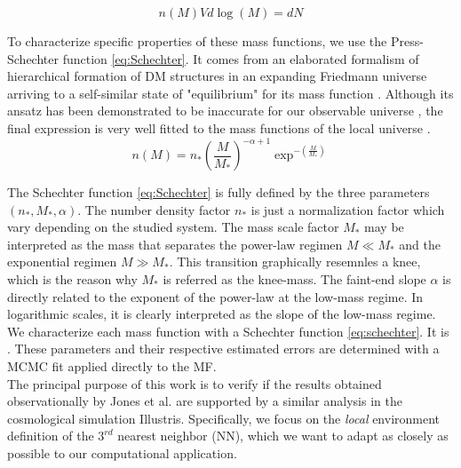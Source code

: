 \documentclass[a4paper,fleqn,usenatbib]{mnras}
\begin{document}
\begin{equation}
n(M)Vd\log{(M)} =  dN
\end{equation}

To characterize specific properties of these mass functions, we use the Press-Schechter function \ref{eq:Schechter}. 
It comes from an elaborated formalism of hierarchical formation of DM structures in an expanding Friedmann universe arriving to a self-similar state of "equilibrium" for its mass function \cite{Schechter1976}.
Although its ansatz has been demonstrated to be inaccurate for our observable universe \cite{inaccurateSchechter}, the final expression is very well fitted to the mass functions of the local universe \cite{wellfitSchechter}.\\

\begin{equation}
n\left( M \right) = n_*\left( \frac{M}{M_*} \right)^{-\alpha+1}\exp^{-\left( \frac{M}{M_*}\right)}
\label{eq:Schechter}
\end{equation}

The Schechter function \ref{eq:Schechter} is fully defined by the three parameters $(n_*,M_*,\alpha)$. 
The number density factor $n_*$ is just a normalization factor which vary depending on the studied system. 
The mass scale factor $M_*$ may be interpreted as the mass that separates the power-law regimen $M \ll M_*$ and the exponential regimen $M \gg M_*$. 
This transition graphically resemnles a knee, which is the reason why $M_*$ is referred as the knee-mass.
The faint-end slope $\alpha$ is directly related to the exponent of the power-law at the low-mass regime.
In logarithmic scales, it is clearly interpreted as the slope of the low-mass regime.\\




We characterize each mass function with a Schechter
function \ref{eq:schechter}. It is . These parameters and their
respective estimated errors are determined with a MCMC fit
applied directly to the MF.\\


The principal purpose of this work is to verify if the results obtained observationally by Jones et al. \cite{jones1} are supported by a similar analysis in the cosmological simulation Illustris. Specifically, we focus on the \textit{local} environment definition of the $3^{rd}$ nearest neighbor (NN), which we want to adapt as closely as possible to our computational application.\\ 
\end{document}
